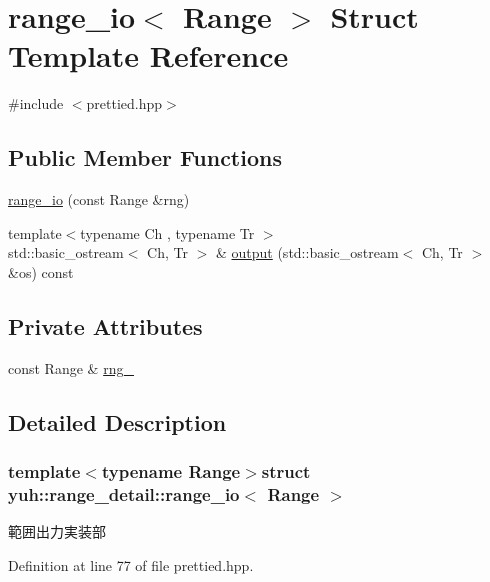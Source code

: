 \hypertarget{structyuh_1_1range__detail_1_1range__io}{\section{range\-\_\-io$<$ \-Range $>$ \-Struct \-Template \-Reference}
\label{da/d75/structyuh_1_1range__detail_1_1range__io}
}


{\ttfamily \#include $<$prettied.\-hpp$>$}

\subsection*{\-Public \-Member \-Functions}
\begin{DoxyCompactItemize}
\item 
\hyperlink{structyuh_1_1range__detail_1_1range__io_a380ab6cfecb5051591a6b12311764a14}{range\-\_\-io} (const \-Range \&rng)
\item 
{\footnotesize template$<$typename Ch , typename Tr $>$ }\\std\-::basic\-\_\-ostream$<$ \-Ch, \-Tr $>$ \& \hyperlink{structyuh_1_1range__detail_1_1range__io_a052a6e871c2df8d90729645678be1d4d}{output} (std\-::basic\-\_\-ostream$<$ \-Ch, \-Tr $>$ \&os) const 
\end{DoxyCompactItemize}
\subsection*{\-Private \-Attributes}
\begin{DoxyCompactItemize}
\item 
const \-Range \& \hyperlink{structyuh_1_1range__detail_1_1range__io_a1dc23cf32ae84636d442489c9629b987}{rng\-\_\-}
\end{DoxyCompactItemize}


\subsection{\-Detailed \-Description}
\subsubsection*{template$<$typename Range$>$struct yuh\-::range\-\_\-detail\-::range\-\_\-io$<$ Range $>$}

範囲出力実装部 

\-Definition at line 77 of file prettied.\-hpp.



